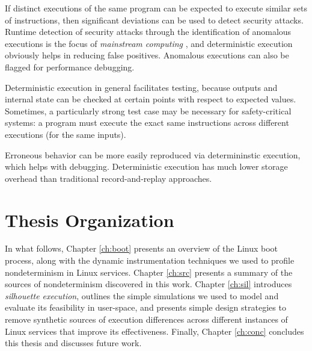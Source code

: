  \newline
If distinct executions of the same program can be
expected to execute similar sets of instructions, then
significant deviations can be used to detect security
attacks. Runtime detection of security attacks through the
identification of anomalous executions is the focus of \emph{mainstream computing} \cite{stephenson2010mainstream},
and deterministic execution obviously helps in reducing false
positives. 
Anomalous executions can also be flagged for performance
debugging. \newline

  \newline
Deterministic execution in general facilitates testing,
because outputs and internal state can be checked at 
certain points with respect to expected values. 
Sometimes, a particularly strong 
test case may be necessary for safety-critical 
systems: a program 
must execute the exact same instructions 
across different executions (for the same inputs). \newline 

 \newline 
Erroneous behavior can be more easily reproduced
via determininstic execution, which
helps with debugging. Deterministic
execution has much lower storage overhead
than traditional record-and-replay approaches. 

\section{Thesis Organization} 
In what follows, Chapter \ref{ch:boot} presents an overview of
the Linux boot process, along with the dynamic instrumentation
techniques we used to profile nondeterminism in Linux services.
Chapter \ref{ch:src} presents a summary of the sources of nondeterminism
discovered in this work.
Chapter \ref{ch:sil} introduces {\em silhouette execution},
outlines the simple simulations we used to model
and evaluate its feasibility in user-space,
and presents simple design strategies to remove
synthetic sources of execution differences across
different instances of Linux services that
improve its effectiveness.
Finally, Chapter \ref{ch:conc} concludes this thesis and discusses future work.
